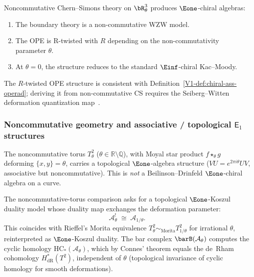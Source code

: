 \begin{remark}\label{rem:nc-cs-comparison}
Noncommutative Chern--Simons theory on $\bR^3_\theta$ produces
$\Eone$-chiral algebras:
\begin{enumerate}[label=(\roman*)]
\item The boundary theory is a non-commutative WZW model.
\item The OPE is R-twisted with $R$ depending on the non-commutativity parameter $\theta$.
\item At $\theta = 0$, the structure reduces to the standard $\Einf$-chiral Kac--Moody.
\end{enumerate}
\end{remark}

\begin{remark}
The $R$-twisted OPE structure is consistent with Definition~\ref*{V1-def:chiral-ass-operad}; deriving it from non-commutative CS requires the Seiberg--Witten deformation quantization map~\cite{SW99}.
\end{remark}


\subsubsection{\texorpdfstring{Noncommutative geometry and associative / topological $\mathsf{E}_1$ structures}{Noncommutative geometry and associative / topological E1 structures}}

\begin{construction}
\label{constr:nc-torus-e1}
The noncommutative torus $T^2_\theta$ ($\theta \in \mathbb{R} \setminus \mathbb{Q}$), with Moyal star product $f \star_\theta g$ deforming $\{x,y\}=\theta$, carries a topological $\Eone$-algebra structure ($VU = e^{2\pi i\theta}UV$, associative but noncommutative). This is \emph{not} a Beilinson--Drinfeld $\Eone$-chiral algebra on a curve.
\end{construction}

\begin{remark}
\label{rem:nc-torus-koszul-morita}
The noncommutative-torus comparison asks for a topological
$\Eone$-Koszul duality model whose duality map exchanges the deformation
parameter:
\[
\mathcal{A}_\theta^! \;\cong\; \mathcal{A}_{1/\theta}.
\]
This coincides with Rieffel's Morita equivalence $T^2_\theta \sim_{\mathrm{Morita}} T^2_{1/\theta}$
for irrational $\theta$, reinterpreted as $\Eone$-Koszul duality.
The bar complex $\barB(\mathcal{A}_\theta)$ computes the cyclic homology
$\mathrm{HC}_*(\mathcal{A}_\theta)$, which by Connes' theorem equals the de~Rham
cohomology $H^*_{\mathrm{dR}}(T^2)$, independent of $\theta$ (topological invariance
of cyclic homology for smooth deformations).
\end{remark}

